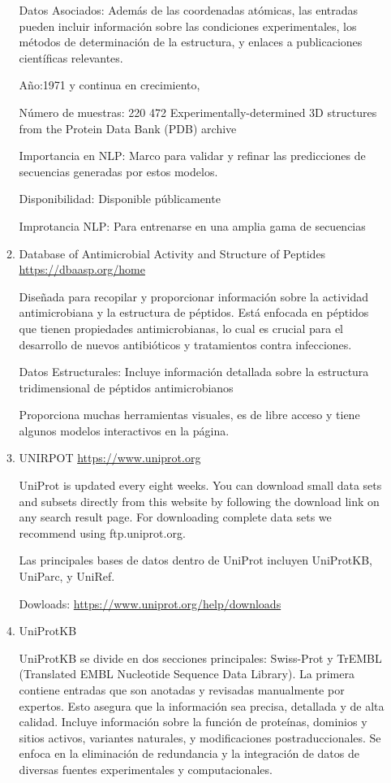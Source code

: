 \documentclass[11pt, twoside]{report}
\begin{document}
\begin{itemize}
\begin{enumerate}
	    Datos Asociados: Además de las coordenadas atómicas, las entradas pueden incluir información sobre las condiciones experimentales, los métodos de determinación de la estructura, y enlaces a publicaciones científicas relevantes.


        Año:1971 y continua en crecimiento, 
        
        Número de muestras: 220 472 Experimentally-determined 3D structures from the Protein Data Bank (PDB) archive

        Importancia en NLP: Marco para validar y refinar las predicciones de secuencias generadas por estos modelos.

        Disponibilidad: Disponible públicamente

        Improtancia NLP: Para entrenarse en una amplia gama de secuencias


        \item Database of Antimicrobial Activity and Structure of Peptides \url{https://dbaasp.org/home}
        
        Diseñada para recopilar y proporcionar información sobre la actividad antimicrobiana y la estructura de péptidos. Está enfocada en péptidos que tienen propiedades antimicrobianas, lo cual es crucial para el desarrollo de nuevos antibióticos y tratamientos contra infecciones.

        Datos Estructurales: Incluye información detallada sobre la estructura tridimensional de péptidos antimicrobianos

        Proporciona muchas herramientas visuales, es de libre acceso y tiene algunos modelos interactivos en la página.

        \item UNIRPOT \url{https://www.uniprot.org}
        
        UniProt is updated every eight weeks. You can download small data sets and subsets directly from this website by following the download link on any search result page. For downloading complete data sets we recommend using ftp.uniprot.org.


        Las principales bases de datos dentro de UniProt incluyen UniProtKB, UniParc, y UniRef.



        Dowloads: \url{https://www.uniprot.org/help/downloads}


        \item UniProtKB
        
        UniProtKB se divide en dos secciones principales:  Swiss-Prot y TrEMBL (Translated EMBL Nucleotide Sequence Data Library).
        La primera contiene entradas que son anotadas y revisadas manualmente por expertos. Esto asegura que la información sea precisa, detallada y de alta calidad. Incluye información sobre la función de proteínas, dominios y sitios activos, variantes naturales, y modificaciones postraduccionales. Se enfoca en la eliminación de redundancia y la integración de datos de diversas fuentes experimentales y computacionales.



\end{enumerate}
\end{itemize}
\end{document}
